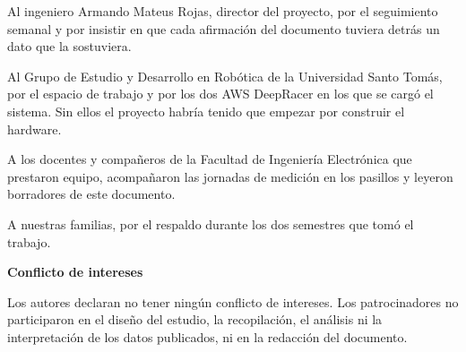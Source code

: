


Al ingeniero Armando Mateus Rojas, director del proyecto, por el seguimiento
semanal y por insistir en que cada afirmación del documento tuviera detrás un
dato que la sostuviera.

Al Grupo de Estudio y Desarrollo en Robótica de la Universidad Santo Tomás, por
el espacio de trabajo y por los dos AWS DeepRacer en los que se cargó el sistema. Sin ellos el
proyecto habría tenido que empezar por construir el hardware.

A los docentes y compañeros de la Facultad de Ingeniería Electrónica que
prestaron equipo, acompañaron las jornadas de medición en los pasillos y leyeron
borradores de este documento.

A nuestras familias, por el respaldo durante los dos semestres que tomó el
trabajo.

\vspace{1.5em}
\textbf{Conflicto de intereses}

Los autores declaran no tener ningún conflicto de intereses. Los patrocinadores
no participaron en el diseño del estudio, la recopilación, el análisis ni la
interpretación de los datos publicados, ni en la redacción del documento.

